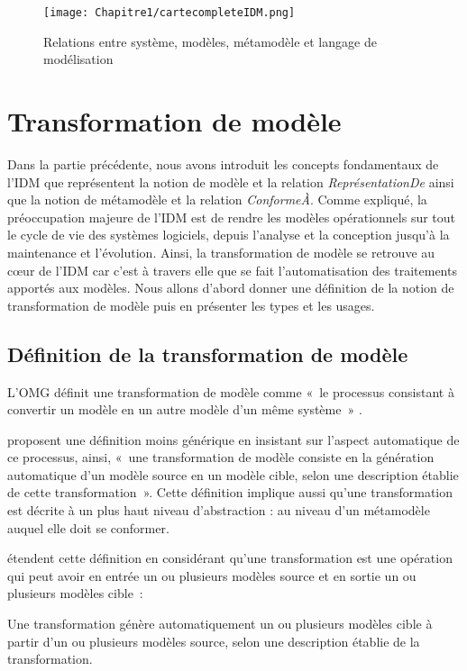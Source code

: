 \begin{figure}[!htbp]
 \begin{center}
  \texttt{[image: Chapitre1/cartecompleteIDM.png]}
 \end{center}
 \caption{Relations entre système, modèles, métamodèle et langage de modélisation \protect\cite{favre2006ingenierie}}
 \label{fig:carteFavre}
\end{figure}

\section{Transformation de modèle}
Dans la partie précédente, nous avons introduit les concepts fondamentaux de l'IDM que représentent la notion de modèle et la relation \textit{ReprésentationDe} ainsi que la notion de métamodèle et la relation \textit{ConformeÀ}. Comme expliqué, la préoccupation majeure de l'IDM est de rendre les modèles opérationnels sur tout le cycle de vie des systèmes logiciels, depuis l'analyse et la conception jusqu'à la maintenance et l'évolution. Ainsi, la transformation de modèle se retrouve au cœur de l'IDM car c'est à travers elle que se fait l'automatisation des traitements apportés aux modèles. Nous allons d'abord donner une définition de la notion de transformation de modèle puis en présenter les types et les usages.

\subsection{Définition de la transformation de modèle}
L'OMG définit une transformation de modèle comme «~le processus consistant à convertir un modèle en un autre modèle d'un même système~» \cite{omg2011meta}. 

\cite{kleppe2003mda} proposent une définition moins générique en insistant sur l'aspect automatique de ce processus, ainsi, «~une transformation de modèle consiste en la génération automatique d'un modèle source en un modèle cible, selon une description établie de cette transformation~». Cette définition implique aussi qu'une transformation est décrite à un plus haut niveau d'abstraction : au niveau d'un métamodèle auquel elle doit se conformer. 

\cite{mens2006taxonomy} étendent cette définition en considérant qu'une transformation est une opération qui peut avoir en entrée un ou plusieurs modèles source et en sortie un ou plusieurs modèles cible~: 

\begin{theorem}
Une transformation génère automatiquement un ou plusieurs modèles cible à partir d'un ou plusieurs modèles source, selon une description établie de la transformation. 
\end{theorem}

